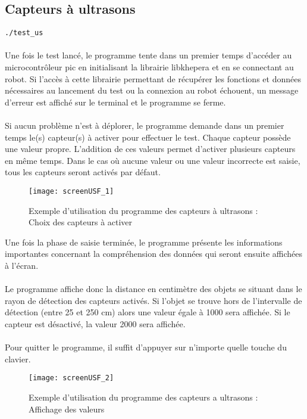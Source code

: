 \documentclass[11pt]{article} %
\begin{document}
\subsection{Capteurs à ultrasons}
\verb|./test_us|\\
 \\
Une fois le test lancé, le programme tente dans un premier temps d’accéder au microcontrôleur pic en initialisant la librairie libkhepera et en se connectant au robot. Si l’accès à cette librairie permettant de récupérer les fonctions et données nécessaires au lancement du test ou la connexion au robot échouent, un message d’erreur est affiché sur le terminal et le programme se ferme.\\
\\
Si aucun problème n’est à déplorer, le programme demande dans un premier temps le(s) capteur(s) à activer pour effectuer le test. Chaque capteur possède une valeur propre. L’addition de ces valeurs permet d’activer plusieurs capteurs en même temps. Dans le cas où aucune valeur ou une valeur incorrecte est saisie, tous les capteurs seront activés par défaut.\\
\begin{figure}[H]
\caption{Exemple d'utilisation du programme des capteurs à ultrasons : Choix des capteurs à activer}
\texttt{[image: screenUSF\_1]}
\end{figure}
Une fois la phase de saisie terminée, le programme présente les informations importantes concernant la compréhension des données qui seront ensuite affichées à l’écran.\\
\\
Le programme affiche donc la distance en centimètre des objets se situant dans le rayon de détection des capteurs activés. Si l’objet se trouve hors de l’intervalle de détection (entre 25 et 250 cm) alors une valeur égale à 1000 sera affichée. Si le capteur est désactivé, la valeur 2000 sera affichée.\\
\\
Pour quitter le programme, il suffit d’appuyer sur n’importe quelle touche du clavier.\\
\begin{figure}[H]
\caption{Exemple d'utilisation du programme des capteurs a ultrasons : Affichage des valeurs}
\texttt{[image: screenUSF\_2]}
\end{figure}
\end{document}
